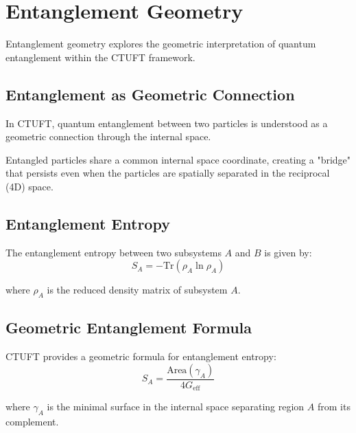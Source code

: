 \section{Entanglement Geometry}
\label{sec:entanglement}

Entanglement geometry explores the geometric interpretation of quantum entanglement within the CTUFT framework.

\subsection{Entanglement as Geometric Connection}

In CTUFT, quantum entanglement between two particles is understood as a geometric connection through the internal space.

\begin{insight}[Entanglement = Internal Space Bridge]
Entangled particles share a common internal space coordinate, creating a "bridge" that persists even when the particles are spatially separated in the reciprocal (4D) space.
\end{insight}

\subsection{Entanglement Entropy}

The entanglement entropy between two subsystems $A$ and $B$ is given by:
\begin{equation}
S_A = -\text{Tr}(\rho_A \ln \rho_A)
\end{equation}

where $\rho_A$ is the reduced density matrix of subsystem $A$.

\subsection{Geometric Entanglement Formula}

CTUFT provides a geometric formula for entanglement entropy:
\begin{equation}
S_A = \frac{\text{Area}(\gamma_A)}{4G_{\text{eff}}}
\end{equation}

where $\gamma_A$ is the minimal surface in the internal space separating region $A$ from its complement.
